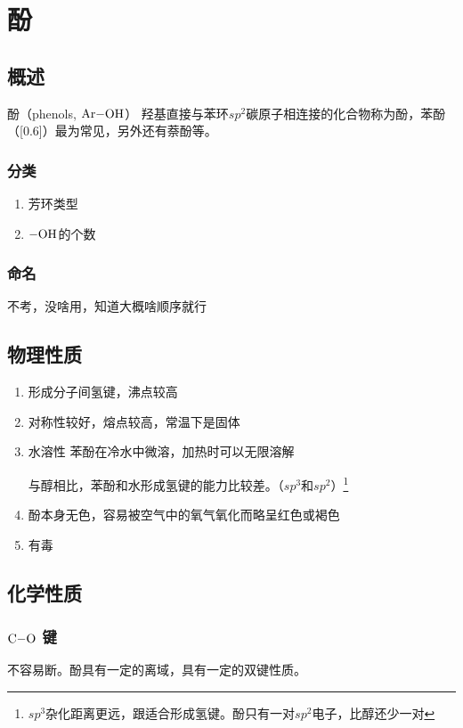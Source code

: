 \documentclass[a4paper]{ctexrep}
\begin{document}
    \chapter{酚}
    \section{概述}
    酚（phenols, $\ce{Ar-OH}$）
    羟基直接与苯环\textit{$sp^2$}碳原子相连接的化合物称为酚，苯酚（\scalebox{0.6}[0.6]{}）最为常见，另外还有萘酚等。
    
    \subsection{分类}
    \begin{enumerate}
        \item 芳环类型
        \item $\ce{-OH}$的个数
    \end{enumerate}
    \subsection{命名}
    不考，没啥用，知道大概啥顺序就行

    \section{物理性质}
    \begin{enumerate}
        \item 形成分子间氢键，沸点较高
        \item 对称性较好，熔点较高，常温下是固体
        \item 水溶性 苯酚在冷水中微溶，加热时可以无限溶解 \par
        与醇相比，苯酚和水形成氢键的能力比较差。（$sp^3$和$sp^2$）\footnote{$sp^3$杂化距离更远，跟适合形成氢键。酚只有一对$sp^2$电子，比醇还少一对}
        \item 酚本身无色，容易被空气中的氧气氧化而略呈红色或褐色
        \item 有毒
    \end{enumerate}

    \section{化学性质}
    \subsection{$\ce{C-O}$ 键}
    不容易断。酚具有一定的离域，具有一定的双键性质。
\end{document}

